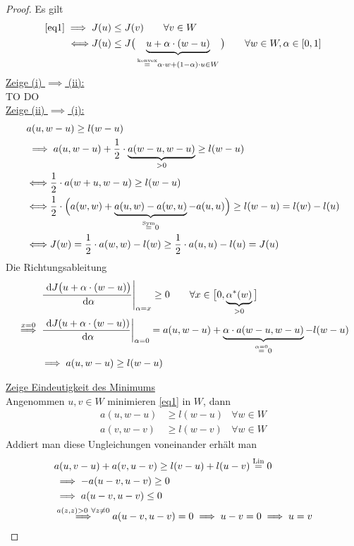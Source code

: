 \documentclass[12pt,a4paper]{article}
\begin{document}
\begin{proof}
Es gilt
\begin{align*}
\eqref{eq1}\implies
J(u)&\leq J(v)\qquad\forall v\in W\\
\Longleftrightarrow
J(u)&\leq J\big(\underbrace{u+\alpha\cdot(w-u)}_{\stackrel{\text{konvex}}{=}\alpha\cdot w+(1-\alpha)\cdot u\in W}\big)\qquad\forall w\in W,\alpha\in[0,1]
\end{align*}
\underline{Zeige (i) $\implies$ (ii):}\\
TO DO\\

\underline{Zeige (ii) $\implies$ (i):}
\begin{align*}
&a(u,w-u)\geq l(w-u)\\
&\implies
a(u,w-u)+\frac{1}{2}\cdot\underbrace{a(w-u,w-u)}_{>0}\geq l(w-u)\\
&\Longleftrightarrow
\frac{1}{2}\cdot a(w+u,w-u)\geq l(w-u)\\
&\Longleftrightarrow
\frac{1}{2}\cdot\Big(a(w,w)+\underbrace{a(u,w)-a(w,u)}_{\stackrel{\text{Sym}}{=}0}-a(u,u)\Big)\geq l(w-u)=l(w)-l(u)\\
&\Longleftrightarrow
J(w)=\frac{1}{2}\cdot a(w,w)-l(w)\geq\frac{1}{2}\cdot a(u,u)-l(u)=J(u)
\end{align*}
Die Richtungsableitung
\begin{align*}
	&\left.\frac{\text{ d} J\big(u+\alpha\cdot (w-u)\big)}{\text{ d}\alpha}\right|_{\alpha=x}\geq0\qquad\forall x\in\big[0,\underbrace{\alpha^\ast(w)}_{>0}\big] \\
	\stackrel{x=0}{\implies}
	&\left.\frac{\text{ d} J(u+\alpha\cdot(w-u))}{\text{ d}\alpha}\right|_{\alpha=0}
=a(u,w-u)+\underbrace{\alpha\cdot a(w-u,w-u)}_{\stackrel{\alpha=0}{=}0}-l(w-u)\\
&\implies a(u,w-u)\geq l(w-u)
\end{align*}

\underline{Zeige Eindeutigkeit des Minimums}\\
Angenommen $u,v\in W$ minimieren \eqref{eq1} in $W$, dann
\begin{align*}
a(u,w-u)&\geq l(w-u) &\forall w\in W\\
a(v,w-v)&\geq l(w-v) &\forall w\in W
\end{align*}
Addiert man diese Ungleichungen voneinander erhält man
\begin{align*}
&a(u,v-u)+a(v,u-v)\geq l(v-u)+l(u-v)\stackrel{\text{Lin}}{=}0\\
&\implies -a(u-v,u-v)\geq0\\
&\implies a(u-v,u-v)\leq 0\\
&\stackrel{a(z,z)>0~\forall z\neq0}{\implies}
a(u-v,u-v)=0\implies u-v=0\implies u=v
\end{align*}

\end{proof}
\end{document}
